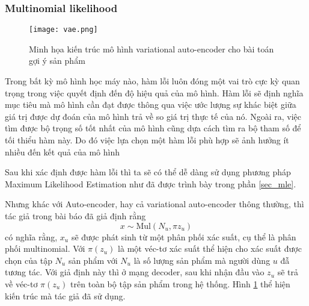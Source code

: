     \subsubsection{Multinomial likelihood}
    \label{Mult-likelighood}
    \begin{figure}
        \centering
        \texttt{[image: vae.png]}
        \caption{Minh họa kiến trúc mô hình variational auto-encoder cho bài toán gợi ý sản phẩm}
        \label{fig_mvae}
    \end{figure}
    Trong bất kỳ mô hình học máy nào, hàm lỗi luôn đóng một vai trò cực kỳ quan trọng trong việc quyết định đến độ hiệu quả của mô hình. 
    Hàm lỗi sẽ định nghĩa mục tiêu mà mô hình cần đạt được thông qua việc ước lượng sự khác biệt giữa giá trị được dự đoán của mô hình trả về so giá trị thực tế của nó.
    Ngoài ra, việc tìm được bộ trọng số tốt nhất của mô hình cũng dựa cách tìm ra bộ tham số để tối thiểu hàm này.
    Do đó việc lựa chọn một hàm lỗi phù hợp sẽ ảnh hưởng ít nhiều đến kết quả của mô hình 

    Sau khi xác định được hàm lỗi thì ta sẽ có thể dễ dàng sử dụng phương pháp Maximum Likelihood Estimation như đã được trình bày trong phần \ref{sec_mle}.

    Nhưng khác với Auto-encoder, hay cả variational auto-encoder thông thường, thì tác giả trong bài báo \cite{mvae} đã giả định rằng 
    \begin{equation}
        \label{asumpt_xu}
        x \sim \text{Mul}(N_u,\pi{z_u})
    \end{equation}
    có nghĩa rằng, $x_u$ sẽ được phát sinh từ một phân phối xác suất, cụ thể là phân phối multinomial.
    Với $\pi(z_u)$ là một véc-tơ xác suất thể hiện cho xác suất được chọn của tập $N_u$ sản phẩm  với $N_u$ là số lượng sản phẩm mà người dùng $u$ đẫ tương tác. 
    Với giả định này thì ở mạng decoder, sau khi nhận đầu vào $z_u$ sẽ trả về véc-tơ $\pi(z_u)$ trên toàn bộ tập sản phẩm trong hệ thống. 
    Hình \ref{fig_mvae} thể hiện kiến trúc mà tác giả đã sử dụng. 

